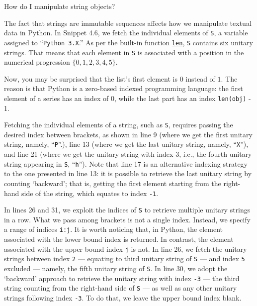 \documentclass[a4paper,11pt]{book}
\newcommand{\question}[1]{%
    \begin{tcolorbox}[colback=comp_c!10,colframe=comp_c,sidebyside align=top,width=\linewidth,before skip=1ex]
        #1
    \end{tcolorbox}
    \switchcolumn%
}
\newcommand{\note}[1]{%
    \begin{tcolorbox}[colback=white!0,colframe=white!10,width=\linewidth,before skip=1ex]
        #1
    \end{tcolorbox}
}
\begin{document}
\begin{paracol}{2}
	\question{How do I manipulate string objects?}
	\note{The fact that strings are immutable sequences affects how we manipulate textual data in Python. In Snippet 4.6, we fetch the individual elements of \texttt{S}, a variable assigned to ``\texttt{Python 3.X}.'' As per the built-in function \href{https://docs.python.org/3/tutorial/introduction.html\#strings}{\texttt{len}}, \texttt{S} contains six unitary strings. That means that each element in \texttt{S} is associated with a position in the numerical progression $\{0, 1, 2, 3, 4, 5\}$.
	
	\quad Now, you may be surprised that the list's first element is $0$ instead of $1$. The reason is that Python is a zero-based indexed programming language: the first element of a series has an index of $0$, while the last part has an index \texttt{len(obj)} - 1.
	
	\quad Fetching the individual elements of a string, such as \texttt{S}, requires passing the desired index between brackets, as shown in line 9 (where we get the first unitary string, namely, ``\texttt{P}''.), line 13 (where we get the last unitary string, namely, ``\texttt{X}''), and line 21 (where we get the unitary string with index $3$, i.e., the fourth unitary string appearing in \texttt{S}, ``\texttt{h}''). Note that line 17 is an alternative indexing strategy to the one presented in line 13: it is possible to retrieve the last unitary string by counting `backward'; that is, getting the first element starting from the right-hand side of the string, which equates to index \texttt{-1}.
	
	\quad In lines 26 and 31, we exploit the indices of \texttt{S} to retrieve multiple unitary strings in a row. What we pass among brackets is not a single index. Instead, we specify a range of indices \texttt{i:j}. It is worth noticing that, in Python, the element associated with the lower bound index \texttt{} is returned. In contrast, the element associated with the upper bound index \texttt{j} is not. In line 26, we fetch the unitary strings between index \texttt{2} --- equating to third unitary string of \texttt{S} --- and index \texttt{5} excluded --- namely, the fifth unitary string of \texttt{S}. In line 30, we adopt the `backward' approach to retrieve the unitary string with index \texttt{-3} --- the third string counting from the right-hand side of \texttt{S} --- as well as any other unitary strings following index \texttt{-3}. To do that, we leave the upper bound index blank.} 
\end{paracol}
\clearpage
\end{document}
